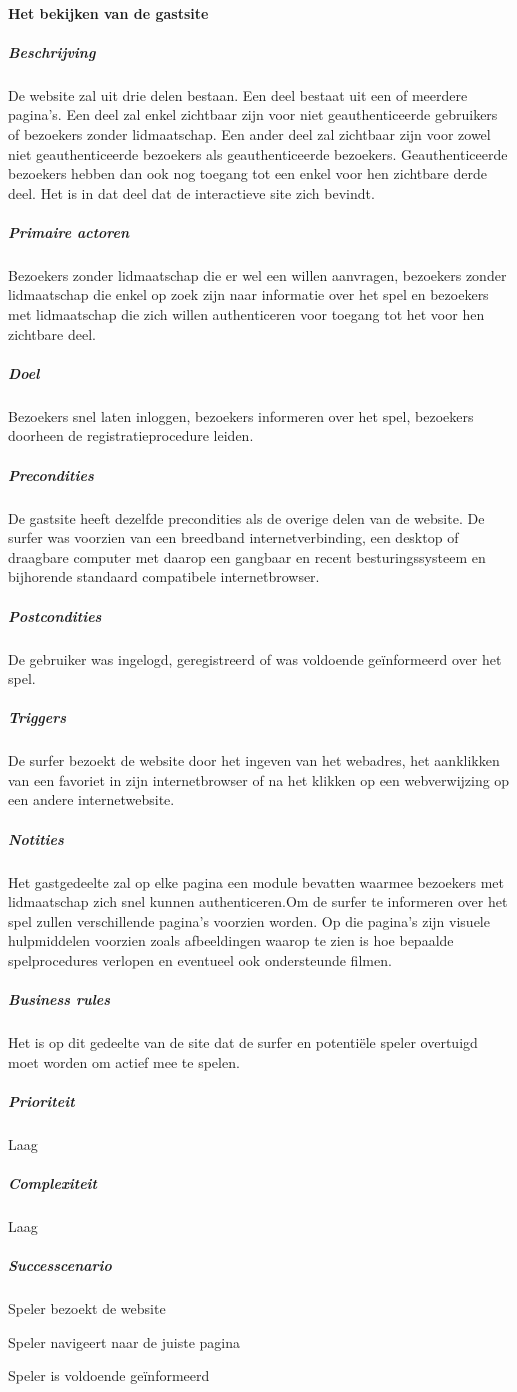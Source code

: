 \paragraph{Het bekijken van de gastsite}
\begin{compact}
\subparagraph{Beschrijving}De website zal uit drie delen bestaan. Een deel bestaat uit een of meerdere pagina's. Een deel zal enkel zichtbaar zijn voor niet geauthenticeerde gebruikers of bezoekers zonder lidmaatschap. Een ander deel zal zichtbaar zijn voor zowel niet geauthenticeerde bezoekers als geauthenticeerde bezoekers. Geauthenticeerde bezoekers hebben dan ook nog toegang tot een enkel voor hen zichtbare derde deel. Het is in dat deel dat de interactieve site zich bevindt.
\subparagraph{Primaire actoren} Bezoekers zonder lidmaatschap die er wel een willen aanvragen, bezoekers zonder lidmaatschap die enkel op zoek zijn naar informatie over het spel en bezoekers met lidmaatschap die zich willen authenticeren voor toegang tot het voor hen zichtbare deel.
\subparagraph{Doel} Bezoekers snel laten inloggen, bezoekers informeren over het spel, bezoekers doorheen de registratieprocedure leiden.
\subparagraph{Precondities} De gastsite heeft dezelfde precondities als de overige delen van de website. De surfer was voorzien van een breedband internetverbinding, een desktop of draagbare computer met daarop een gangbaar en recent besturingssysteem en bijhorende standaard compatibele internetbrowser.
\subparagraph{Postcondities} De gebruiker was ingelogd, geregistreerd of was voldoende ge\"informeerd over het spel.
\subparagraph{Triggers} De surfer bezoekt de website door het ingeven van het webadres, het aanklikken van een favoriet in zijn internetbrowser of na het klikken op een webverwijzing op een andere internetwebsite.
\subparagraph{Notities} Het gastgedeelte zal op elke pagina een module bevatten waarmee bezoekers met lidmaatschap zich snel kunnen authenticeren.\small{Om de surfer te informeren over het spel zullen verschillende pagina's voorzien worden. Op die pagina's zijn visuele hulpmiddelen voorzien zoals afbeeldingen waarop te zien is hoe bepaalde spelprocedures verlopen en eventueel ook ondersteunde filmen.}
\subparagraph{Business rules}Het is op dit gedeelte van de site dat de surfer en potenti\"ele speler overtuigd moet worden om actief mee te spelen.
\subparagraph{Prioriteit}Laag
\subparagraph{Complexiteit}Laag
\subparagraph{Successcenario}
\begin{enumerate_compact}
 \item Speler bezoekt de website
 \item Speler navigeert naar de juiste pagina
 \item Speler is voldoende ge\"informeerd
\end{enumerate_compact}
\end{compact}

